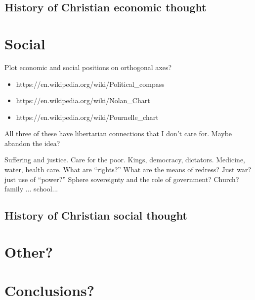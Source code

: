 \documentclass[12pt]{article}
\begin{document}
\subsection{History of Christian economic thought}
\label{sec:economic_history}



\section{Social}
\label{sec:social}
Plot economic and social positions on orthogonal axes?
\begin{itemize}
\item{https://en.wikipedia.org/wiki/Political\_compass}
\item{https://en.wikipedia.org/wiki/Nolan\_Chart}
\item{https://en.wikipedia.org/wiki/Pournelle\_chart}
\end{itemize}
All three of these have libertarian connections that I don't care for. Maybe abandon the idea?

Suffering and justice. Care for the poor. 
Kings, democracy, dictators.
Medicine, water, health care. What are ``rights?''
What are the means of redress?
Just war? just use of ``power?''
Sphere sovereignty and the role of government? Church? family ... school...


\subsection{History of Christian social thought}
\label{sec:social_history}


\section{Other?}
\section{Conclusions?}



\printbibliography
\end{document}
